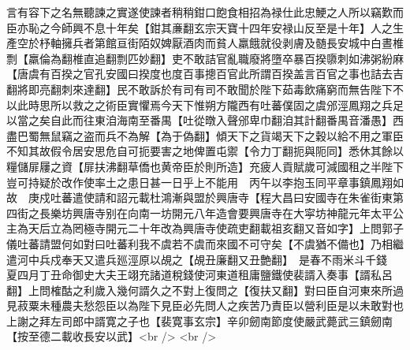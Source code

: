 言有容下之名無聽諫之實遂使諫者稍稍鉗口飽食相招為禄仕此忠鯁之人所以竊歎而臣亦恥之今師興不息十年矣【鉗其亷翻玄宗天寶十四年安禄山反至是十年】人之生產空於杼軸擁兵者第館亘街陌奴婢厭酒肉而貧人羸餓就役剥膚及髄長安城中白晝椎剽【羸倫為翻椎直追翻剽匹妙翻】吏不敢詰官亂職廢將墮卒暴百揆隳刺如沸粥紛麻【唐虞有百揆之官孔安國曰揆度也度百事摠百官此所謂百揆盖言百官之事也詰去吉翻將即亮翻刺來達翻】民不敢訴於有司有司不敢聞於陛下茹毒飲痛窮而無告陛下不以此時思所以救之之術臣實懼焉今天下惟朔方隴西有吐蕃僕固之虞邠涇鳳翔之兵足以當之矣自此而往東洎海南至番禺【吐從暾入聲邠卑巾翻洎其計翻番禺音潘愚】西盡巴蜀無鼠竊之盗而兵不為解【為于偽翻】傾天下之貨竭天下之穀以給不用之軍臣不知其故假令居安思危自可扼要害之地俾置屯禦【令力丁翻扼與阨同】悉休其餘以糧儲屝屨之資【屝扶沸翻草僑也黄帝臣於則所造】充疲人貢賦歲可減國租之半陛下豈可持疑於改作使率土之患日甚一日乎上不能用　丙午以李抱玉同平章事鎮鳳翔如故　庚戍吐蕃遣使請和詔元載杜鴻漸與盟於興唐寺【程大昌曰安國寺在朱雀街東第四街之長樂坊興唐寺别在向南一坊開元八年造會要興唐寺在大寜坊神龍元年太平公主為天后立為罔極寺開元二十年改為興唐寺使疏吏翻載祖亥翻又音如字】上問郭子儀吐蕃請盟何如對曰吐蕃利我不虞若不虞而來國不可守矣【不虞猶不備也】乃相繼遣河中兵戍奉天又遣兵廵涇原以覘之【覘丑廉翻又丑艶翻】　是春不雨米斗千錢　夏四月丁丑命御史大夫王翊充諸道稅錢使河東道租庸鹽鐵使裴諝入奏事【諝私呂翻】上問榷酤之利歲入幾何諝久之不對上復問之【復扶又翻】對曰臣自河東來所過見菽粟未種農夫愁怨臣以為陛下見臣必先問人之疾苦乃責臣以營利臣是以未敢對也上謝之拜左司郎中諝寛之子也【裴寛事玄宗】辛卯劒南節度使嚴武薨武三鎮劒南【按至德二載收長安以武】<br />
<br />
